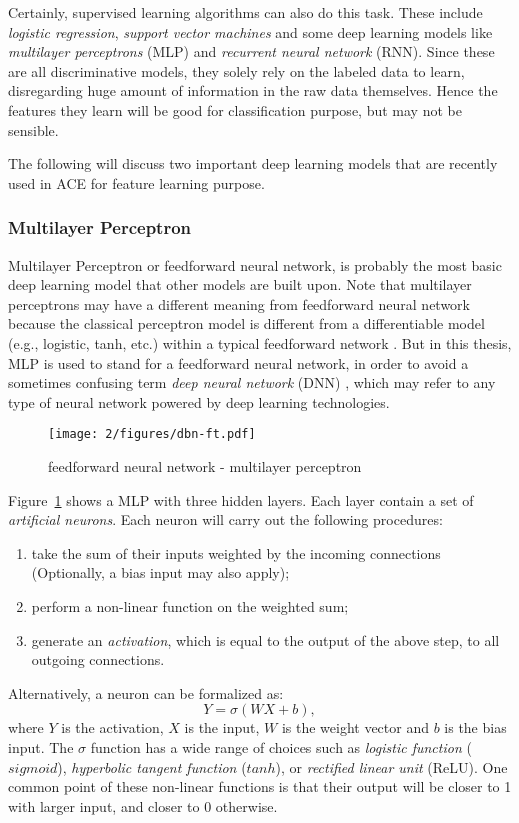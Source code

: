 Certainly, supervised learning algorithms can also do this task. These include {\it logistic regression}, {\it support vector machines} and some deep learning models like {\it multilayer perceptrons} (MLP) and {\it recurrent neural network} (RNN). Since these are all discriminative models, they solely rely on the labeled data to learn, disregarding huge amount of information in the raw data themselves. Hence the features they learn will be good for classification purpose, but may not be sensible.

The following will discuss two important deep learning models that are recently used in ACE for feature learning purpose.

\subsubsection{Multilayer Perceptron}
Multilayer Perceptron or feedforward neural network, is probably the most basic deep learning model that other models are built upon. Note that multilayer perceptrons may have a different meaning from feedforward neural network because the classical perceptron model \cite{rosenblatt1958perceptron} is different from a differentiable model (e.g., logistic, tanh, etc.) within a typical feedforward network \cite{rumelhart1988parallel}. But in this thesis, MLP is used to stand for a feedforward neural network, in order to avoid a sometimes confusing term {\it deep neural network} (DNN) \cite{deng2014deep}, which may refer to any type of neural network powered by deep learning technologies.

\begin{figure}[htb]
\centering
\texttt{[image: 2/figures/dbn-ft.pdf]}
\caption{feedforward neural network - multilayer perceptron}
\label{fig:2-dbn-ft}
\end{figure}
Figure~\ref{fig:2-dbn-ft} shows a MLP with three hidden layers. Each layer contain a set of {\it artificial neurons}. Each neuron will carry out the following procedures:
\begin{enumerate}
\item take the sum of their inputs weighted by the incoming connections (Optionally, a bias input may also apply);
\item perform a non-linear function on the weighted sum;
\item generate an {\it activation}, which is equal to the output of the above step, to all outgoing connections.
\end{enumerate}
Alternatively, a neuron can be formalized as:
\begin{equation}
Y = \sigma(WX+b),
\end{equation}
where $Y$ is the activation, $X$ is the input, $W$ is the weight vector and $b$ is the bias input. The $\sigma$ function has a wide range of choices \cite{sigtia2014improved} such as {\it logistic function} ($sigmoid$), {\it hyperbolic tangent function} ($tanh$), or {\it rectified linear unit} (ReLU). One common point of these non-linear functions is that their output will be closer to 1 with larger input, and closer to 0 otherwise.

